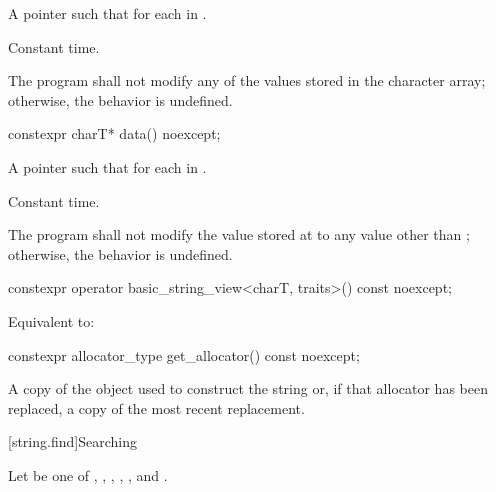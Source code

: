 \begin{itemdescr}
\pnum
\returns
A pointer  such that  for each
 in .

\pnum
\complexity
Constant time.

\pnum
\remarks
The program shall not modify any of the values stored in the character array; otherwise, the behavior is undefined.
\end{itemdescr}

%
\begin{itemdecl}
constexpr charT* data() noexcept;
\end{itemdecl}

\begin{itemdescr}
\pnum
\returns
A pointer  such that  for each
 in .

\pnum
\complexity
Constant time.

\pnum
\remarks
The program shall not modify the value stored at 
to any value other than ; otherwise, the behavior is undefined.
\end{itemdescr}

%
\begin{itemdecl}
constexpr operator basic_string_view<charT, traits>() const noexcept;
\end{itemdecl}

\begin{itemdescr}
\pnum
\effects
Equivalent to:
\end{itemdescr}

%
\begin{itemdecl}
constexpr allocator_type get_allocator() const noexcept;
\end{itemdecl}

\begin{itemdescr}
\pnum
\returns
A copy of the
object used to construct the string or, if that allocator has been replaced, a
copy of the most recent replacement.
\end{itemdescr}

[string.find]{Searching}

\pnum
{}%
%
%
%
%
%
Let  be one of
, , , ,
, and .

